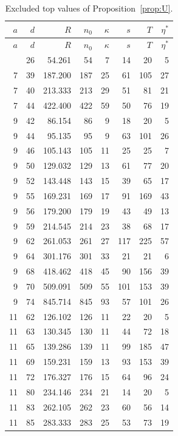 \documentclass[11pt]{article}
\theoremstyle{definition}
\begin{document}
{\small
\begin{longtable}{rrrrrrrr}
\caption{Excluded top values of Proposition~\ref{prop:U}.}\label{tab:U}\\
\toprule
$a$ & $d$ & $R$ & $n_0$ & $\kappa$ & $s$ & $T$ & $\eta^*$ \\
\midrule
\endfirsthead
\toprule
$a$ & $d$ & $R$ & $n_0$ & $\kappa$ & $s$ & $T$ & $\eta^*$ \\
\midrule
\endhead
\bottomrule
\endlastfoot
7 & 26 & 54.261 & 54 & 7 & 14 & 20 & 5 \\
7 & 39 & 187.200 & 187 & 25 & 61 & 105 & 27 \\
7 & 40 & 213.333 & 213 & 29 & 51 & 81 & 21 \\
7 & 44 & 422.400 & 422 & 59 & 50 & 76 & 19 \\
9 & 42 & 86.154 & 86 & 9 & 18 & 20 & 5 \\
9 & 44 & 95.135 & 95 & 9 & 63 & 101 & 26 \\
9 & 46 & 105.143 & 105 & 11 & 25 & 25 & 7 \\
9 & 50 & 129.032 & 129 & 13 & 61 & 77 & 20 \\
9 & 52 & 143.448 & 143 & 15 & 39 & 65 & 17 \\
9 & 55 & 169.231 & 169 & 17 & 91 & 169 & 43 \\
9 & 56 & 179.200 & 179 & 19 & 43 & 49 & 13 \\
9 & 59 & 214.545 & 214 & 23 & 38 & 68 & 17 \\
9 & 62 & 261.053 & 261 & 27 & 117 & 225 & 57 \\
9 & 64 & 301.176 & 301 & 33 & 21 & 21 & 6 \\
9 & 68 & 418.462 & 418 & 45 & 90 & 156 & 39 \\
9 & 70 & 509.091 & 509 & 55 & 101 & 153 & 39 \\
9 & 74 & 845.714 & 845 & 93 & 57 & 101 & 26 \\
11 & 62 & 126.102 & 126 & 11 & 22 & 20 & 5 \\
11 & 63 & 130.345 & 130 & 11 & 44 & 72 & 18 \\
11 & 65 & 139.286 & 139 & 11 & 99 & 185 & 47 \\
11 & 69 & 159.231 & 159 & 13 & 93 & 153 & 39 \\
11 & 72 & 176.327 & 176 & 15 & 64 & 96 & 24 \\
11 & 80 & 234.146 & 234 & 21 & 14 & 20 & 5 \\
11 & 83 & 262.105 & 262 & 23 & 60 & 56 & 14 \\
11 & 85 & 283.333 & 283 & 25 & 53 & 73 & 19 \\

\end{longtable}}
\end{document}
